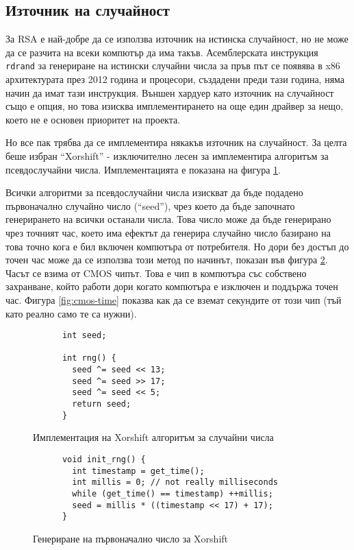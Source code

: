   \subsection{Източник на случайност}
  За RSA е най-добре да се използва източник на истинска случайност, но не може да се разчита на всеки компютър да има такъв. Асемблерската инструкция {\tt rdrand} за генериране на истински случайни числа за пръв път се появява в x86 архитектурата през 2012 година и процесори, създадени преди тази година, няма начин да имат тази инструкция. Външен хардуер като източник на случайност също е опция, но това изисква имплементирането на още един драйвер за нещо, което не е основен приоритет на проекта.

  Но все пак трябва да се имплементира някакъв източник на случайност. За целта беше избран ``Xorshift'' - изключително лесен за имплементира алгоритъм за псевдослучайни числа. Имплементацията е показана на фигура \ref{fig:xorshift}.

  Всички алгоритми за псевдослучайни числа изискват да бъде подадено първоначално случайно число (``seed''), чрез което да бъде започнато генерирането на всички останали числа. Това число може да бъде генерирано чрез точният час, което има ефектът да генерира случайно число базирано на това точно кога е бил включен компютъра от потребителя. Но дори без достъп до точен час може да се използва този метод по начинът, показан във фигура \ref{fig:seed-generation}. Часът се взима от CMOS чипът. Това е чип в компютъра със собствено захранване, който работи дори когато компютъра е изключен и поддържа точен час. Фигура \ref{fig:cmos-time} показва как да се вземат секундите от този чип (тъй като реално само те са нужни).

  \begin{figure}[ht]
    \centering
    \caption{Имплементация на Xorshift алгоритъм за случайни числа}
    \begin{verbatim}
      int seed;

      int rng() {
        seed ^= seed << 13;
        seed ^= seed >> 17;
        seed ^= seed << 5;
        return seed;
      }
    \end{verbatim}
    \label{fig:xorshift}
  \end{figure}

  \begin{figure}[ht]
    \centering
    \caption{Генериране на първоначално число за Xorshift}
    \begin{verbatim}
      void init_rng() {
        int timestamp = get_time();
        int millis = 0; // not really milliseconds
        while (get_time() == timestamp) ++millis;
        seed = millis * ((timestamp << 17) + 17);
      }
    \end{verbatim}
    \label{fig:seed-generation}
  \end{figure}

